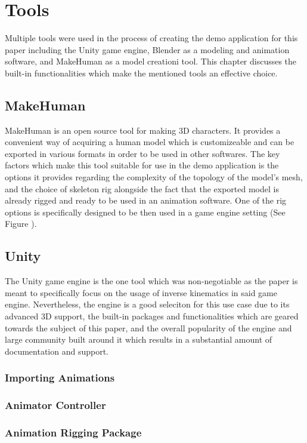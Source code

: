 \chapter{Tools} 
Multiple tools were used in the process of creating the demo application for
this paper including the Unity game engine, Blender as a modeling and animation
software, and MakeHuman as a model creationi tool. This chapter discusses the
built-in functionalities which make the mentioned tools an effective choice.

\section{MakeHuman}
MakeHuman is an open source tool for making 3D characters. It provides
a convenient way of acquiring a human model which is customizeable and can be
exported in various formats in order to be used in other softwares. The key
factors which make this tool suitable for use in the demo application is the
options it provides regarding the complexity of the topology of the model's
mesh, and the choice of skeleton rig alongside the fact that the exported model
is already rigged and ready to be used in an animation software. One of the rig
options is specifically designed to be then used in a game engine setting (See
Figure ).

\section{Unity}
The Unity game engine is the one tool which was non-negotiable as the paper
is meant to specifically focus on the usage of inverse kinematics in said game
engine. Nevertheless, the engine is a good seleciton for this use case due to
its advanced 3D support, the built-in packages and functionalities which are
geared towards the subject of this paper, and the overall popularity of the
engine and large community built around it which results in a substantial amount
of documentation and support. 

\subsection{Importing Animations}

\subsection{Animator Controller}

\subsection{Animation Rigging Package}
